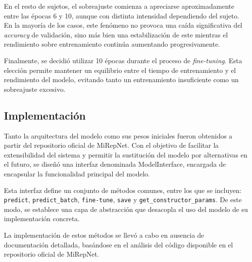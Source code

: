 En el resto de sujetos, el sobreajuste comienza a apreciarse aproximadamente entre las épocas 6 y 10, aunque con distinta intensidad dependiendo del sujeto. En la mayoría de los casos, este fenómeno no provoca una caída significativa del \textit{accuracy} de validación, sino más bien una estabilización de este mientras el rendimiento sobre entrenamiento continúa aumentando progresivamente.

Finalmente, se decidió utilizar 10 épocas durante el proceso de \textit{fine-tuning}. Esta elección permite mantener un equilibrio entre el tiempo de entrenamiento y el rendimiento del modelo, evitando tanto un entrenamiento insuficiente como un sobreajuste excesivo.

\subsection{Implementación}
\label{subsec:implementacionModelo}

Tanto la arquitectura del modelo como sus pesos iniciales fueron obtenidos a partir del repositorio oficial de MiRepNet. Con el objetivo de facilitar la extensibilidad del sistema y permitir la sustitución del modelo por alternativas en el futuro, se diseñó una interfaz denominada ModelInterface, encargada de encapsular la funcionalidad principal del modelo.

Esta interfaz define un conjunto de métodos comunes, entre los que se incluyen: \texttt{predict}, \texttt{predict\_batch}, \texttt{fine-tune}, \texttt{save} y \texttt{get\_constructor\_params}. De este modo, se establece una capa de abstracción que desacopla el uso del modelo de su implementación concreta.

La implementación de estos métodos se llevó a cabo en ausencia de documentación detallada, basándose en el análisis del código disponible en el repositorio oficial de MiRepNet.

